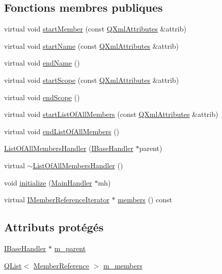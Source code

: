 \subsection*{Fonctions membres publiques}
\begin{DoxyCompactItemize}
\item 
virtual void \hyperlink{class_list_of_all_members_handler_aec5a1999ed6794e3e63d1845ba81aef9}{start\+Member} (const \hyperlink{class_q_xml_attributes}{Q\+Xml\+Attributes} \&attrib)
\item 
virtual void \hyperlink{class_list_of_all_members_handler_a67c03eae929afb345ff9c24efc46eef3}{start\+Name} (const \hyperlink{class_q_xml_attributes}{Q\+Xml\+Attributes} \&attrib)
\item 
virtual void \hyperlink{class_list_of_all_members_handler_ae644f13b142a545c8599929ec4c5f5fc}{end\+Name} ()
\item 
virtual void \hyperlink{class_list_of_all_members_handler_aeda584e6579244d4a4dbdb00c0100151}{start\+Scope} (const \hyperlink{class_q_xml_attributes}{Q\+Xml\+Attributes} \&attrib)
\item 
virtual void \hyperlink{class_list_of_all_members_handler_aa13b4c1f1997726a2250bcf621e949dc}{end\+Scope} ()
\item 
virtual void \hyperlink{class_list_of_all_members_handler_a4c19559c65760613e363a70067ade08a}{start\+List\+Of\+All\+Members} (const \hyperlink{class_q_xml_attributes}{Q\+Xml\+Attributes} \&attrib)
\item 
virtual void \hyperlink{class_list_of_all_members_handler_a32802f7c5b0a68d2e951306e92431063}{end\+List\+Of\+All\+Members} ()
\item 
\hyperlink{class_list_of_all_members_handler_ab0fb2af5c4458349e14b868cf82dfbfc}{List\+Of\+All\+Members\+Handler} (\hyperlink{class_i_base_handler}{I\+Base\+Handler} $\ast$parent)
\item 
virtual \hyperlink{class_list_of_all_members_handler_aa6b2b2c81818b4f71173496d0916b3cb}{$\sim$\+List\+Of\+All\+Members\+Handler} ()
\item 
void \hyperlink{class_list_of_all_members_handler_a79614404dc412d70214a7becafea6e04}{initialize} (\hyperlink{class_main_handler}{Main\+Handler} $\ast$mh)
\item 
virtual \hyperlink{class_i_member_reference_iterator}{I\+Member\+Reference\+Iterator} $\ast$ \hyperlink{class_list_of_all_members_handler_a82b6d75befbea40467e461cbc85da2e5}{members} () const 
\end{DoxyCompactItemize}
\subsection*{Attributs protégés}
\begin{DoxyCompactItemize}
\item 
\hyperlink{class_i_base_handler}{I\+Base\+Handler} $\ast$ \hyperlink{class_list_of_all_members_handler_a89e0a78b3ddc9d822c23cd3126a377de}{m\+\_\+parent}
\item 
\hyperlink{class_q_list}{Q\+List}$<$ \hyperlink{class_member_reference}{Member\+Reference} $>$ \hyperlink{class_list_of_all_members_handler_a14a4aad7648733c9ecca9d1365dcfbc8}{m\+\_\+members}
\end{DoxyCompactItemize}
